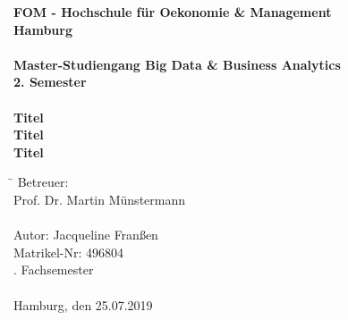 		\begin{titlepage}
			\begin{center}
					\textbf{\large FOM - Hochschule für Oekonomie \& Management \\
						Hamburg \\
						\ \\
						Master-Studiengang Big Data \& Business Analytics \\
						2. Semester \\
						\ \\
						Titel\\
						Titel\\
						Titel 
						}
				
				\begin{tabbing}
					\hspace{2.5cm}\=\kill
					Betreuer: \>  \\
					\> Prof. Dr. Martin Münstermann \glqq \grqq \\
					\ \\
					Autor: \> Jacqueline Franßen \\
					\> Matrikel-Nr: 496804 \\
					. Fachsemester \\
					\ \\
					Hamburg, den 25.07.2019
				\end{tabbing}
			\end{center}
		\end{titlepage}

%

			\setcounter{tocdepth}{3}
			\setcounter{secnumdepth}{3}		
			\thispagestyle{empty}
			\tableofcontents
			\newpage
			\listoffigures
			\listoftables
			\printglossary[type=acronym,style=listdotted,title=Abkürzungsverzeichnis,toctitle=Abkürzungsverzeichnis] 
			\newpage
			\thispagestyle{empty}